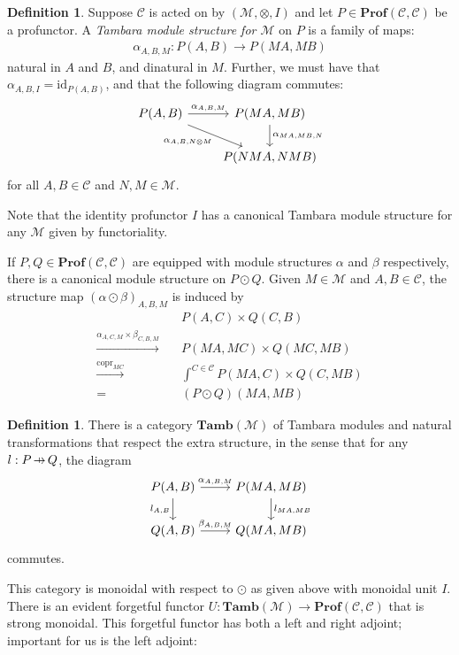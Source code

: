 \documentclass[11pt,a4paper]{article}
\theoremstyle{plain}
\theoremstyle{definition}
\newtheorem{definition}[theorem]{Definition}
\newcommand{\C}{\mathscr{C}}
\newcommand{\M}{\mathscr{M}}
\newcommand{\Prof}{\mathbf{Prof}}
\newcommand{\Tamb}{\mathbf{Tamb}}
\newcommand{\id}{\mathrm{id}}
\DeclareMathOperator{\copr}{copr}
\newcommand{\hto}{\ensuremath{\,\mathaccent\shortmid\rightarrow\,}}
\begin{document}
\begin{definition}
Suppose $\C$ is acted on by $(\M, \otimes, I)$ and let $P \in \Prof(\C, \C)$ be a profunctor. A \emph{Tambara module structure for $\M$} on $P$ is a family of maps:
\begin{align*}
\alpha_{A,B,M} : P(A,B) \to P(MA, MB)
\end{align*}
natural in $A$ and $B$, and dinatural in $M$. Further, we must have that $\alpha_{A,B,I} = \id_{P(A,B)}$, and that the following diagram commutes:
\[
\begin{tikzcd}
P(A,B) \ar[r, "\alpha_{A,B,M}"] \ar[dr, "\alpha_{A, B, N \otimes M}" below left] & P(MA, MB) \ar[d, "\alpha_{MA, MB, N}" right] \\
& P(NMA, NMB)
\end{tikzcd}
\]
for all $A, B \in \C$ and $N, M \in \M$.
\end{definition}

Note that the identity profunctor $I$ has a canonical Tambara module structure for any $\M$ given by functoriality.

If $P, Q \in \Prof(\C, \C)$ are equipped with module structures $\alpha$ and $\beta$ respectively, there is a canonical module structure on $P \odot Q$. Given $M \in \M$ and $A,B \in \C$, the structure map $(\alpha \odot \beta)_{A,B,M}$ is induced by
\begin{align*}
&P(A,C) \times Q(C,B)  \\
\xrightarrow{\alpha_{A,C,M} \times \beta_{C,B,M}} \quad& P(MA, MC) \times Q(MC, MB) \\
\xrightarrow{\copr_{MC}} \quad&\int^{C \in \C} P(MA, C) \times Q(C, MB) \\
= \quad&(P \odot Q)(MA, MB)
\end{align*}

\begin{definition}
There is a category $\Tamb(\M)$ of Tambara modules and natural transformations that respect the extra structure, in the sense that for any $l : P \hto Q$, the diagram
\[
\begin{tikzcd}
P(A,B) \ar[r, "\alpha_{A,B,M}"] \ar[d, "l_{A,B}" left] & P(MA, MB) \ar[d, "l_{MA, MB}" right] \\
Q(A,B) \ar[r, "\beta_{A,B,M}"] & Q(MA, MB)
\end{tikzcd}
\]
commutes.
\end{definition}

This category is monoidal with respect to $\odot$ as given above with monoidal unit $I$. There is an evident forgetful functor $U : \Tamb(\M) \to \Prof(\C, \C)$ that is strong monoidal. This forgetful functor has both a left and right adjoint; important for us is the left adjoint:
\end{document}
